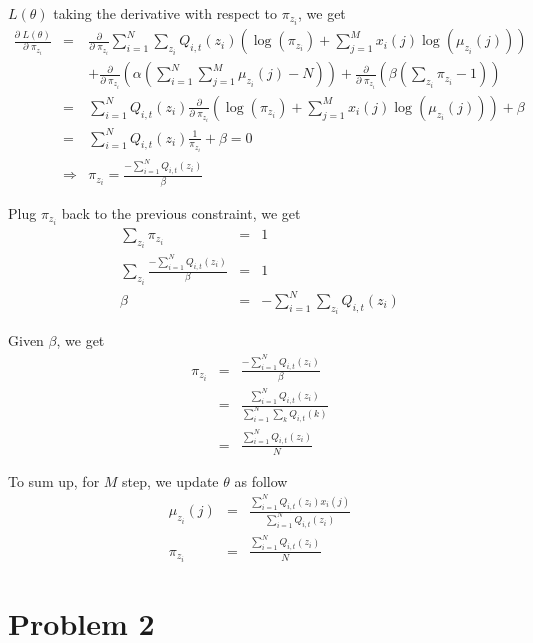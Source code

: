 \documentclass[12pt]{article}
\begin{document}
$L(\theta)$ taking the derivative with respect to $\pi_{z_i}$, we get
\begin{eqnarray*}
  \frac {\partial \; L(\theta)} {\partial \; \pi_{z_i}}
  &=& \frac {\partial} {\partial \; \pi_{z_i}}
  \sum_{i=1}^N \sum_{z_i} Q_{i,t}(z_i) \left( \log { \left( \pi_{z_i} \right)}
      + \sum_{j=1}^M x_i(j) \log { \left( \mu_{z_i}(j) \right)} \right) \\
  && + \frac {\partial} {\partial \; \pi_{z_i}} \left(
    \alpha \left( \sum_{i=1}^N \sum_{j=1}^M \mu_{z_i}(j) - N \right) \right)
    + \frac {\partial} {\partial \; \pi_{z_i}} \left(
    \beta \left( \sum_{z_i} \pi_{z_i} - 1 \right) \right) \\
  &=& \sum_{i=1}^N Q_{i,t}(z_i) \frac {\partial} {\partial \; \pi_{z_i}}
  \left( \log { \left( \pi_{z_i} \right)}
    + \sum_{j=1}^M x_i(j) \log { \left( \mu_{z_i}(j) \right)} \right)
  + \beta \\
  &=& \sum_{i=1}^N Q_{i,t}(z_i) \frac {1}{\pi_{z_i}} + \beta = 0 \\
  &\Rightarrow& \pi_{z_i}
  = \frac {- \sum_{i=1}^N Q_{i,t}(z_i)}{\beta} 
\end{eqnarray*}

Plug $\pi_{z_i}$ back to the previous constraint, we get
\begin{eqnarray*}
  \sum_{z_i} \pi_{z_i} &=& 1 \\
  \sum_{z_i} \frac {- \sum_{i=1}^N Q_{i,t}(z_i)}{\beta} &=& 1 \\
  \beta &=& - \sum_{i=1}^N \sum_{z_i} Q_{i,t}(z_i)
\end{eqnarray*}

Given $\beta$, we get
\begin{eqnarray*}
  \pi_{z_i}
  &=& \frac {- \sum_{i=1}^N Q_{i,t}(z_i)}{\beta} \\
  &=& \frac {\sum_{i=1}^N Q_{i,t}(z_i)} {\sum_{i=1}^N \sum_{k} Q_{i,t}(k)} \\
  &=& \frac {\sum_{i=1}^N Q_{i,t}(z_i)} {N}
\end{eqnarray*}

To sum up, for $M$ step, we update $\theta$ as follow
\begin{eqnarray*}
  \mu_{z_i}(j)
  &=& \frac {\sum_{i=1}^N Q_{i,t}(z_i) x_i(j)}
  {\sum_{i=1}^N Q_{i,t}(z_i)}  \\
  \pi_{z_i}
  &=& \frac {\sum_{i=1}^N Q_{i,t}(z_i)} {N}
\end{eqnarray*}

\section*{Problem 2}
\end{document}

